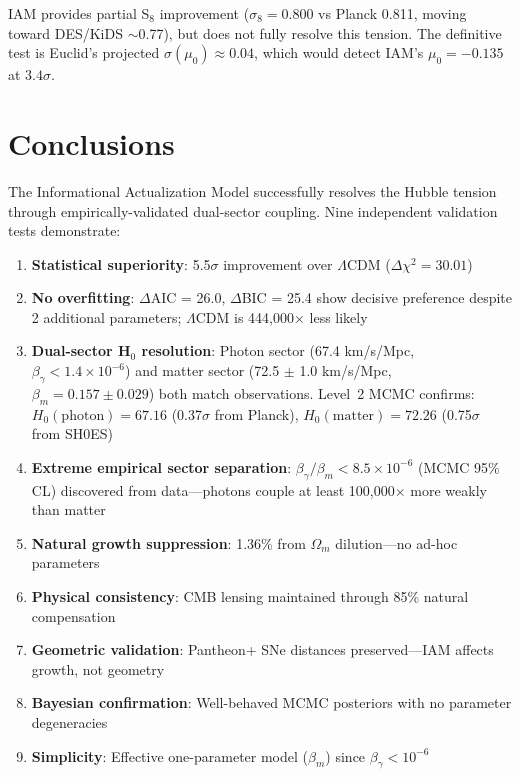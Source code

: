 \documentclass[11pt,letterpaper]{article}
\begin{document}
IAM provides partial S$_8$ improvement ($\sigma_8 = 0.800$ vs Planck 0.811, moving toward DES/KiDS $\sim$0.77), but does not fully resolve this tension. The definitive test is Euclid's projected $\sigma(\mu_0) \approx 0.04$, which would detect IAM's $\mu_0 = -0.135$ at $3.4\sigma$.

\section{Conclusions}

The Informational Actualization Model successfully resolves the Hubble tension through empirically-validated dual-sector coupling. Nine independent validation tests demonstrate:

\begin{enumerate}
\item \textbf{Statistical superiority}: 5.5$\sigma$ improvement over $\Lambda$CDM ($\Delta\chi^2 = 30.01$)
\item \textbf{No overfitting}: $\Delta$AIC = 26.0, $\Delta$BIC = 25.4 show decisive preference despite 2 additional parameters; $\Lambda$CDM is 444,000$\times$ less likely
\item \textbf{Dual-sector H$_0$ resolution}: Photon sector (67.4 km/s/Mpc, $\beta_\gamma < 1.4 \times 10^{-6}$) and matter sector (72.5 $\pm$ 1.0 km/s/Mpc, $\beta_m = 0.157 \pm 0.029$) both match observations. Level~2 MCMC confirms: $H_0(\mathrm{photon}) = 67.16$ (0.37$\sigma$ from Planck), $H_0(\mathrm{matter}) = 72.26$ (0.75$\sigma$ from SH0ES)
\item \textbf{Extreme empirical sector separation}: $\beta_\gamma/\beta_m < 8.5 \times 10^{-6}$ (MCMC 95\% CL) discovered from data---photons couple at least 100,000$\times$ more weakly than matter
\item \textbf{Natural growth suppression}: 1.36\% from $\Omega_m$ dilution---no ad-hoc parameters
\item \textbf{Physical consistency}: CMB lensing maintained through 85\% natural compensation
\item \textbf{Geometric validation}: Pantheon+ SNe distances preserved---IAM affects growth, not geometry
\item \textbf{Bayesian confirmation}: Well-behaved MCMC posteriors with no parameter degeneracies
\item \textbf{Simplicity}: Effective one-parameter model ($\beta_m$) since $\beta_\gamma < 10^{-6}$
\end{enumerate}
\end{document}
